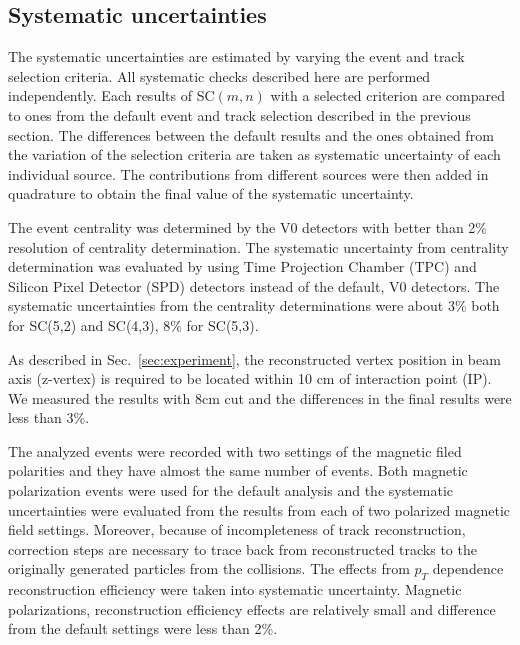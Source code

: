 

\subsection{Systematic uncertainties}
\label{sec:uncertainties}



The systematic uncertainties are estimated by varying the event and track selection criteria. All systematic checks described here are performed independently. 
Each results of SC$(m,n)$ with a selected criterion are compared to ones from the default event and track selection described in the previous section.
The differences between the default results and the ones obtained from the variation of the selection criteria are taken as systematic uncertainty of each individual source.
The contributions from different sources were then added in quadrature to obtain the final value of the systematic uncertainty.

The event centrality was determined by the V0 detectors \cite{Abbas:2013taa} with better than 2\%  resolution of centrality determination. The systematic uncertainty from centrality determination was evaluated by using Time Projection Chamber (TPC) and Silicon Pixel Detector (SPD) \cite{Dellacasa:1999kf} detectors instead of the default, V0 detectors. The systematic uncertainties from the centrality determinations were about 3\% both for SC(5,2) and SC(4,3), 8\% for  SC(5,3).

As described in Sec.~\ref{sec:experiment}, the reconstructed vertex position in beam axis (z-vertex) is required to be located within 10 cm of interaction point (IP).  We measured the results with 8cm cut and the differences in the final results were less than 3\%.  

The analyzed events were recorded with two settings of the magnetic filed polarities and they have almost the same number of events. Both magnetic polarization events were used for the default analysis and the systematic uncertainties were evaluated from the results from each of two polarized magnetic field settings. 
Moreover, because of incompleteness of track reconstruction, correction steps are necessary to trace back from reconstructed tracks to the originally generated particles from the collisions. The effects from $p_T$ dependence reconstruction efficiency were taken into systematic uncertainty. Magnetic polarizations, reconstruction efficiency effects are relatively small and difference from the default settings were less than 2\%.

